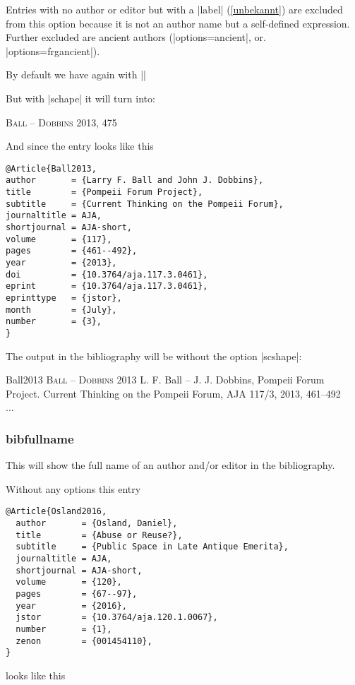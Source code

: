 \documentclass[a4paper,
10pt,
greek,
french,
spanish,
italian,
ngerman,
english
]{ltxdoc}
\begin{document}
Entries with no author or editor but with a |label| (\cref{unbekannt}) are excluded from this option
because it is not an author name but a  self-defined expression.
Further excluded are ancient authors (|options={ancient}|, or. |options={frgancient}|).

By default we have again with |\cite[475]{Ball2013}|
\begin{bsp} \cite[475]{Ball2013} \end{bsp}
 But with |schape| it will turn into:
\begin{bsp}
{\scshape {\color{red}Ball – Dobbins}} 2013, 475
\end{bsp}
And since the entry looks like this
\begin{lstlisting}[style=bibentry,label=Ball2013,caption={{@}Article\{Ball2013,…\} }]
@Article{Ball2013,
author       = {Larry F. Ball and John J. Dobbins},
title        = {Pompeii Forum Project},
subtitle     = {Current Thinking on the Pompeii Forum},
journaltitle = AJA,
shortjournal = AJA-short,
volume       = {117},
pages        = {461--492},
year         = {2013},
doi          = {10.3764/aja.117.3.0461},
eprint       = {10.3764/aja.117.3.0461},
eprinttype   = {jstor},
month        = {July},
number       = {3},
}
\end{lstlisting}


The output in the bibliography will be without the option |scshape|:
\begin{bibbsp}{Ball2013}
{\scshape {\color{red}Ball – Dobbins}} 2013\hspace{3em} L. F. Ball – J. J. Dobbins, Pompeii Forum Project. Current Thinking on the Pompeii Forum, AJA 117/3, 2013, 461–492\\
...
\end{bibbsp}



\subsubsection{bibfullname}\label{bibfullname}
This will show the full name of an author and/or editor in the bibliography.

Without any options this entry
\begin{lstlisting}[style=bibentry,label=Osland2016,caption={{@}Article\{Osland2016,…\} }]
@Article{Osland2016,
  author       = {Osland, Daniel},
  title        = {Abuse or Reuse?},
  subtitle     = {Public Space in Late Antique Emerita},
  journaltitle = AJA,
  shortjournal = AJA-short,
  volume       = {120},
  pages        = {67--97},
  year         = {2016},
  jstor        = {10.3764/aja.120.1.0067},
  number       = {1},
  zenon        = {001454110},
}
\end{lstlisting}
looks like this
\end{document}
